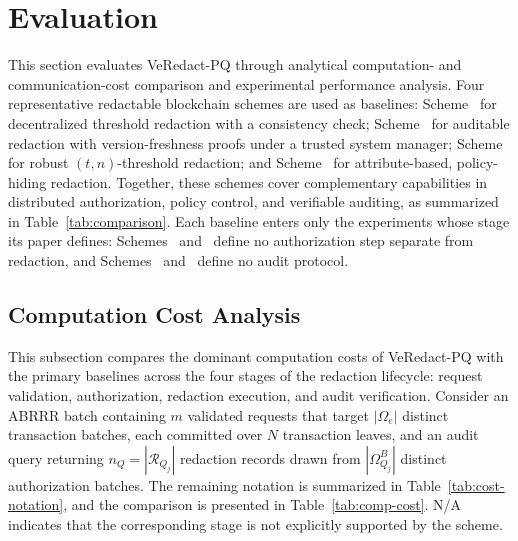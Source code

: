 \documentclass[lettersize,journal]{IEEEtran}
\begin{document}
    
    
    
    
    
    \section{Evaluation}
    \label{sec:evaluation}
    
    This section evaluates VeRedact-PQ through analytical computation- and
    communication-cost comparison and experimental performance analysis.
    Four representative redactable blockchain schemes are used as
    baselines: Scheme~\cite{ref1} for decentralized threshold
    redaction with a consistency check; Scheme~\cite{ref13} for auditable redaction
    with version-freshness proofs under a trusted system manager;
    Scheme~\cite{ref27} for robust $(t,n)$-threshold redaction;
    and Scheme~\cite{ref34} for attribute-based,
    policy-hiding redaction. Together, these schemes cover complementary
    capabilities in distributed authorization, policy control, and
    verifiable auditing, as summarized in Table~\ref{tab:comparison}. Each
    baseline enters only the experiments whose stage its paper defines:
    Schemes~\cite{ref13} and~\cite{ref27} define no authorization step
    separate from redaction, and Schemes~\cite{ref27} and~\cite{ref34}
    define no audit protocol.
    \subsection{Computation Cost Analysis}
    \label{subsec:computation-cost}
    
    This subsection compares the dominant computation costs of VeRedact-PQ
    with the primary baselines across the four stages of the redaction
    lifecycle: request validation, authorization, redaction execution, and
    audit verification. Consider an ABRRR batch containing $m$ validated
    requests that target $|\Omega_e|$ distinct transaction batches, each
    committed over $N$ transaction leaves, and an audit query returning
    $n_Q=|\mathcal{R}_{Q_j}|$ redaction records drawn from
    $|\Omega_{Q_j}^B|$ distinct authorization batches. The remaining
    notation is summarized in Table~\ref{tab:cost-notation}, and the
    comparison is presented in Table~\ref{tab:comp-cost}. N/A indicates that
    the corresponding stage is not explicitly supported by the scheme.
    
\end{document}
